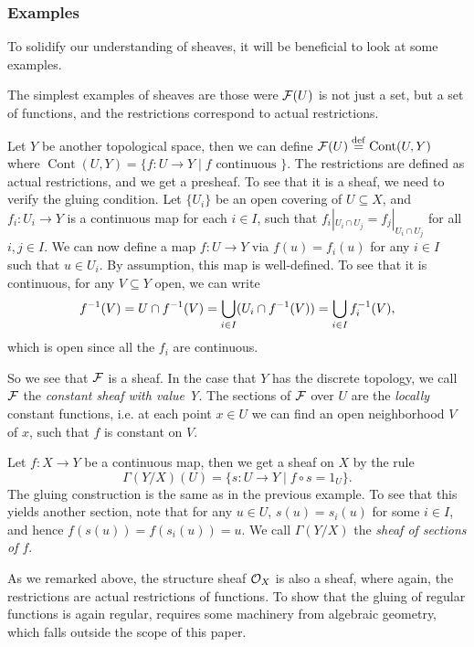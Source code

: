 \documentclass{article}
\DeclareMathOperator{\Cont}{Cont}
\begin{document}
\subsubsection{Examples}
To solidify our understanding of sheaves, it will be beneficial to look
at some examples.
\begin{example}
    The simplest examples of sheaves are those were
    $\mathcal{F}(U)$ is not just a set, but a set of functions, and the
    restrictions correspond to actual restrictions.

\end{example}
\begin{example}
    Let $Y$ be another topological space, then we can define $\mcF(U) \defeq \Cont(U, Y)$
    where $\Cont(U,Y) = \{f\colon U \to Y \mid f \text{ continuous }\}$.
    The restrictions are defined as actual restrictions, and we get a presheaf. To see that
    it is a sheaf, we need to verify the gluing condition.
    Let $\{U_i\}$ be an open covering of $U\subseteq X$,
    and $f_i \colon U_i \to Y$ is a continuous map for each $i\in I$,
    such that $f_i|_{U_i \cap U_j} = f_j |_{U_i \cap U_j}$ for all $i,j\in I$.
    We can now define a map $f\colon U \to Y$ via $f(u) = f_i(u)$ for any $i\in I$
    such that $u\in U_i$. By assumption, this map is well-defined.
    To see that it is continuous, for any $V\subseteq Y$ open,
    we can write
    \begin{equation*}
        f^{-1}(V) = U \cap f^{-1}(V)=
        \bigcup_{i\in I} (U_i \cap f^{-1}(V)) =
        \bigcup_{i\in I}f_i^{-1}(V),
    \end{equation*}
    which is open since all the $f_i$ are continuous.

    So we see that $\mathcal{F}$ is a sheaf.
    In the case that $Y$ has the discrete topology,
    we call $\mathcal{F}$ the \emph{constant sheaf with value Y}.
    The sections of $\mathcal{F}$ over $U$ are the \emph{locally} constant functions,
    i.e. at each point $x\in U$ we can find an open neighborhood $V$ of $x$,
    such that $f$ is constant on $V$.
\end{example}
\begin{example}

    Let $f\colon X\to Y$ be a continuous map, then we get a sheaf
    on $X$ by the rule
    \begin{equation*}
        \Gamma(Y/X)(U) = \{s\colon U\to Y \mid f\circ s = 1_{U}\}.
    \end{equation*}
    The gluing construction is the same as in the previous example.
    To see that this yields another section, note that for
    any $u \in U$, $s(u) = s_i(u)$ for some $i\in I$, and hence
    $f(s(u)) = f(s_i(u)) = u$.
    We call $\Gamma(Y/X)$ the \emph{sheaf of sections of $f$}.
\end{example}
\begin{example}
    As we remarked above, the structure sheaf $\mathcal{O}_X$ is also a sheaf,
    where again, the restrictions are actual restrictions of functions.
    To show that the gluing of regular functions is again regular,
    requires some machinery from algebraic geometry, which falls outside
    the scope of this paper.
\end{example}
\end{document}
